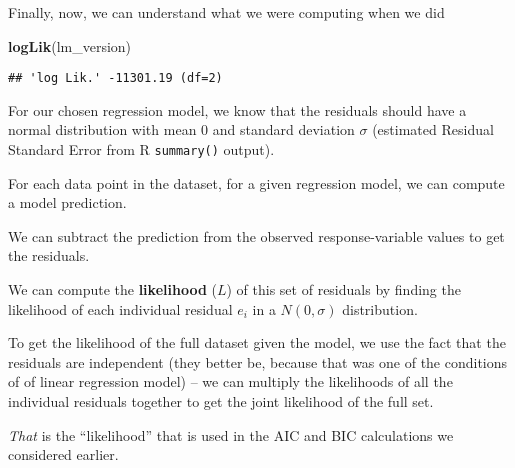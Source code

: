 \documentclass[]{book}
\newenvironment{Shaded}{\begin{snugshade}}{\end{snugshade}}
\newcommand{\KeywordTok}[1]{\textcolor[rgb]{0.13,0.29,0.53}{\textbf{#1}}}
\newcommand{\NormalTok}[1]{#1}
\begin{document}
Finally, now, we can understand what we were computing when we did

\begin{Shaded}
\begin{Highlighting}[]
\KeywordTok{logLik}\NormalTok{(lm_version)}
\end{Highlighting}
\end{Shaded}

\begin{verbatim}
## 'log Lik.' -11301.19 (df=2)
\end{verbatim}

For our chosen regression model, we know that the residuals should have a normal distribution with mean 0 and standard deviation \(\sigma\) (estimated Residual Standard Error from R \texttt{summary()} output).

For each data point in the dataset, for a given regression model, we can compute a model prediction.

We can subtract the prediction from the observed response-variable values to get the residuals.

We can compute the \textbf{likelihood} (\(L\)) of this set of residuals by finding the likelihood of each individual residual \(e_i\) in a \(N(0, \sigma)\) distribution.

To get the likelihood of the full dataset given the model, we use the fact that the residuals are independent (they better be, because that was one of the conditions of of linear regression model) -- we can multiply the likelihoods of all the individual residuals together to get the joint likelihood of the full set.

\emph{That} is the ``likelihood'' that is used in the AIC and BIC calculations we considered earlier.


\end{document}
